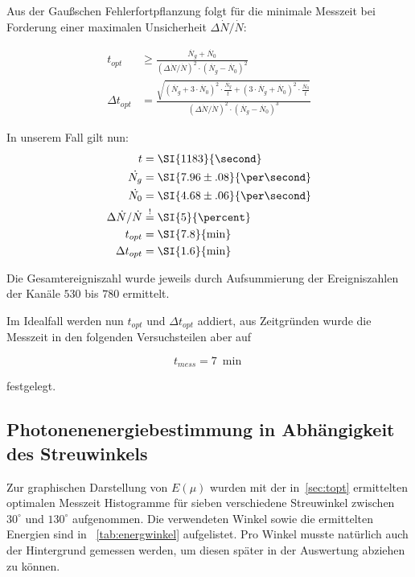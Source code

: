 \documentclass[draft, slug=CS, room=Andreas-Schubert-Bau\,\ Labor\ 406,
supervisor=Juliane\ Volkmer, coursedate=29.\ 11.\ 2019]{../../Lab_Report_LaTeX/lab_report}
\begin{document}
Aus der Gau\ss{}schen Fehlerfortpflanzung folgt f\"ur die minimale
Messzeit bei Forderung einer maximalen Unsicherheit
\(\Delta\dot{N}/\dot{N}\):

\begin{align}
  \label{eq:mtime}
  t_{opt} & \geq\frac{\dot{N_g} +
            \dot{N_0}}{(\Delta\dot{N}/\dot{N})^2\cdot (\dot{N_g} -
            \dot{N_0})^2} \\
  \Delta t_{opt} &=\frac{\sqrt{(\dot{N_g} +
                   3\cdot\dot{N_0})^2\cdot\frac{\dot{N_g}}{t}
                   + (3\cdot\dot{N_g} + \dot{N_0})^2\cdot\frac{\dot{N_0}}{t}}}{(\Delta\dot{N}/\dot{N})^2\cdot (\dot{N_g} -
            \dot{N_0})^3}
\end{align}

In unserem Fall gilt nun:
\begin{align}
  t &=\SI{1183}{\second} \\
  \dot{N_g} &=\SI{7.96\pm.08}{\per\second} \\
  \dot{N_0} &=\SI{4.68\pm.06}{\per\second} \\
  \Delta\dot{N}/\dot{N} &\overset{!}{=}\SI{5}{\percent} \\
  t_{opt} &=\SI{7.8}{\min} \\
  \Delta t_{opt} &=\SI{1.6}{\min}
\end{align}

Die Gesamtereigniszahl wurde jeweils durch Aufsummierung der
Ereigniszahlen der Kan\"ale \(530\) bis \(780\) ermittelt.

Im Idealfall werden nun \(t_{opt}\) und \(\Delta t_{opt}\) addiert,
aus Zeitgr\"unden wurde die Messzeit in den folgenden Versuchsteilen
aber auf

\begin{equation}
  \label{eq:fmtime}
  t_{mess} = \SI{7}{\min}
\end{equation}

festgelegt.

\subsection{Photonenenergiebestimmung in Abhängigkeit des Streuwinkels}
\label{sec:energwinkel}

Zur graphischen Darstellung von \(E(\mu)\) wurden mit der in~\ref{sec:topt} ermittelten
optimalen Messzeit Histogramme für sieben verschiedene Streuwinkel zwischen \(30^\circ\) und
\(130^\circ\) aufgenommen. Die verwendeten Winkel sowie die ermittelten Energien sind in
~\ref{tab:energwinkel} aufgelistet. Pro Winkel musste natürlich auch der Hintergrund gemessen
werden, um diesen später in der Auswertung abziehen zu können.
\end{document}

